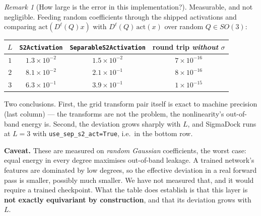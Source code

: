 \documentclass[11pt,a4paper]{report}
\theoremstyle{definition}
\theoremstyle{remark}
\newtheorem{remark}[remark]{Remark}
\newcommand{\pyfunc}[1]{\texttt{#1}}
\begin{document}
\begin{remark}[How large is the error in this implementation?]
\label{rem:s2-error-measured}
Measurable, and not negligible. Feeding random coefficients through the
shipped activations and comparing $\mathrm{act}(D^\ell(Q)x)$ with
$D^\ell(Q)\,\mathrm{act}(x)$ over random $Q\in SO(3)$:

\begin{center}
\begin{tabular}{cccc}
\toprule
$L$ & \pyfunc{S2Activation} & \pyfunc{SeparableS2Activation} & round trip \emph{without} $\sigma$ \\
\midrule
$1$ & $1.3\times10^{-2}$ & $1.5\times10^{-2}$ & $7\times10^{-16}$ \\
$2$ & $8.1\times10^{-2}$ & $2.1\times10^{-1}$ & $8\times10^{-16}$ \\
$3$ & $6.3\times10^{-1}$ & $3.9\times10^{-1}$ & $1\times10^{-15}$ \\
\bottomrule
\end{tabular}
\end{center}

Two conclusions. First, the grid transform pair itself is exact to machine
precision (last column) --- the transforms are not the problem, the
nonlinearity's out-of-band energy is. Second, the deviation grows sharply
with $L$, and SigmaDock runs at $L=3$ with \texttt{use\_sep\_s2\_act=True},
i.e.\ in the bottom row.

\textbf{Caveat.} These are measured on \emph{random Gaussian} coefficients,
the worst case: equal energy in every degree maximises out-of-band leakage. A
trained network's features are dominated by low degrees, so the effective
deviation in a real forward pass is smaller, possibly much smaller. We have
not measured that, and it would require a trained checkpoint. What the table
does establish is that this layer is \textbf{not exactly equivariant by
construction}, and that its deviation grows with $L$.
\end{remark}
\end{document}
